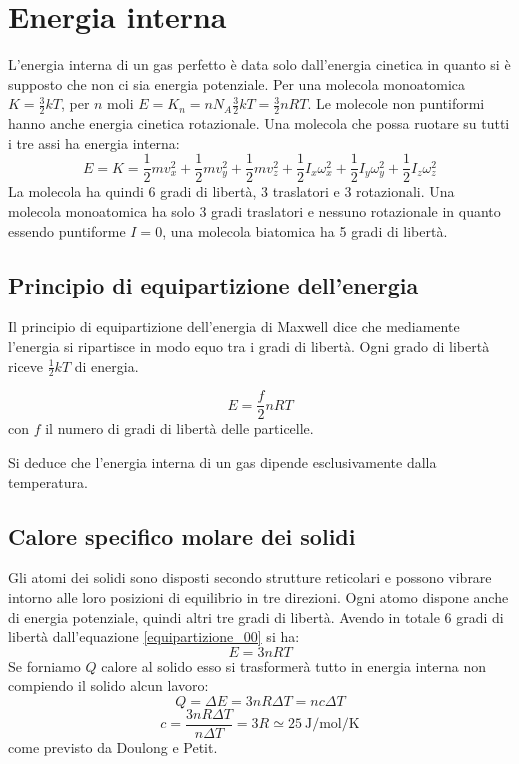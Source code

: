 \section{Energia interna}
L'energia interna di un gas perfetto è data solo dall'energia cinetica in quanto si è supposto che non ci sia energia potenziale. Per una molecola monoatomica $K=\frac{3}{2}kT$, per $n$ moli $E=K_n=nN_A\frac{3}{2}kT=\frac{3}{2}nRT$. Le molecole non puntiformi hanno anche energia cinetica rotazionale. Una molecola che possa ruotare su tutti i tre assi ha energia interna:
\[E=K=\frac{1}{2}mv_x^2+\frac{1}{2}mv_y^2+\frac{1}{2}mv_z^2+\frac{1}{2}I_x\omega_x^2+\frac{1}{2}I_y\omega_y^2+\frac{1}{2}I_z\omega_z^2\]
La molecola ha quindi 6 gradi di libertà, 3 traslatori e 3 rotazionali. Una molecola monoatomica ha solo 3 gradi traslatori e nessuno rotazionale in quanto essendo puntiforme $I=0$, una molecola biatomica ha 5 gradi di libertà.
\subsection{Principio di equipartizione dell'energia}
Il principio di equipartizione dell'energia di Maxwell dice che mediamente l'energia si ripartisce in modo equo tra i gradi di libertà. Ogni grado di libertà riceve $\frac{1}{2}kT$ di energia.
\begin{Pri}
   \begin{equation}
      E=\frac{f}{2}nRT
      \label{equipartizione_00}
   \end{equation}
   con $f$ il numero di gradi di libertà delle particelle.
\end{Pri}
Si deduce che l'energia interna di un gas dipende esclusivamente dalla temperatura.
\subsection{Calore specifico molare dei solidi}
Gli atomi dei solidi sono disposti secondo strutture reticolari e possono vibrare intorno alle loro posizioni di equilibrio in tre direzioni. Ogni atomo dispone anche di energia potenziale, quindi altri tre gradi di libertà. Avendo in totale 6 gradi di libertà dall'equazione \eqref{equipartizione_00} si ha:
\[E=3nRT\]
Se forniamo $Q$ calore al solido esso si trasformerà tutto in energia interna non compiendo il solido alcun lavoro:
\[Q=\Delta E=3nR\Delta T=nc\Delta T\]
\[c=\frac{3nR\Delta T}{n\Delta T}=3R\simeq \SI{25}{\joule\per\mole\per\kelvin} \]
come previsto da Doulong e Petit.
